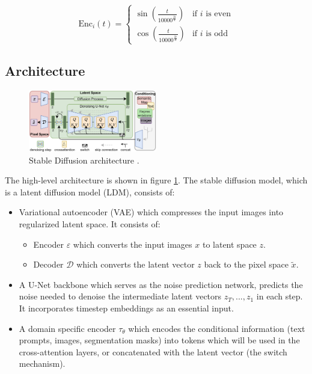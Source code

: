 \begin{equation}
    \text{Enc}_i(t) =
    \begin{cases}
        \sin\left(\frac{t}{10000^{\frac{2i}{d}}}\right) & \text{if } i \text{ is even} \\
        \cos\left(\frac{t}{10000^{\frac{2i}{d}}}\right) & \text{if } i \text{ is odd}
    \end{cases}
    \label{eq:timestep_embeddings}
\end{equation}










\subsection{Architecture}

\begin{figure}
    \centering
    \includegraphics[width=0.5\textwidth]{images/diffusion_models/stable_diffusion/architecture.png}
    \caption{Stable Diffusion architecture \cite{stable_diffusion}.}
    \label{fig:stable_diffusion_architecture}
\end{figure}

The high-level architecture is shown in figure \ref{fig:stable_diffusion_architecture}. The stable diffusion model, which is a latent diffusion model (LDM), consists of: 

\begin{itemize}
    \item Variational autoencoder (VAE) which compresses the input images into regularized latent space. It consists of:
    \begin{itemize}
        \item Encoder $\varepsilon$ which converts the input images $x$ to latent space $z$.
        \item Decoder $\mathcal{D}$ which converts the latent vector $z$ back to the pixel space $\tilde{x}$.
    \end{itemize}
    \item A U-Net backbone which serves as the noise prediction network, predicts the noise needed to denoise the intermediate latent vectors $z_T, ..., z_1$ in each step. It incorporates timestep embeddings as an essential input.
    \item A domain specific encoder $\tau_\theta$ which encodes the conditional information (text prompts, images, segmentation masks) into tokens which will be used in the cross-attention layers, or concatenated with the latent vector (the switch mechanism).
\end{itemize}







